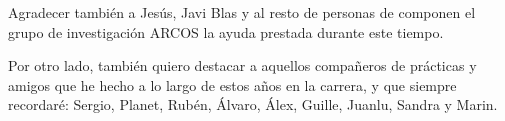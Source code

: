 Agradecer también a Jesús, Javi Blas y al resto de personas de componen el grupo de investigación ARCOS la ayuda prestada durante este tiempo.

Por otro lado, también quiero destacar a aquellos compañeros de prácticas y amigos que he hecho a lo largo de estos años en la carrera, y que siempre recordaré: Sergio, Planet, Rubén, Álvaro, Álex, Guille, Juanlu, Sandra y Marin.



\thispagestyle{empty}



\begin{abstractpage}
%

\end{abstractpage}

% 

\afterpage{\blankpage} %
